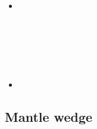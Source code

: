 \begin{scriptsize}
\begin{itemize}
\textcite{ruml20} \\
\item[\twothousandtwentyone] 
\textcite{pocv21} \\ 
\textcite{vepn21} \\
\textcite{adkc21} \\
\textcite{gath21} \\
\textcite{ligl21b} \\
\textcite{gubt21} \\
\item[\twothousandtwentytwo] 
\textcite{rikg22} \\
\end{itemize}
\end{scriptsize}


\subsection{Mantle wedge} 

